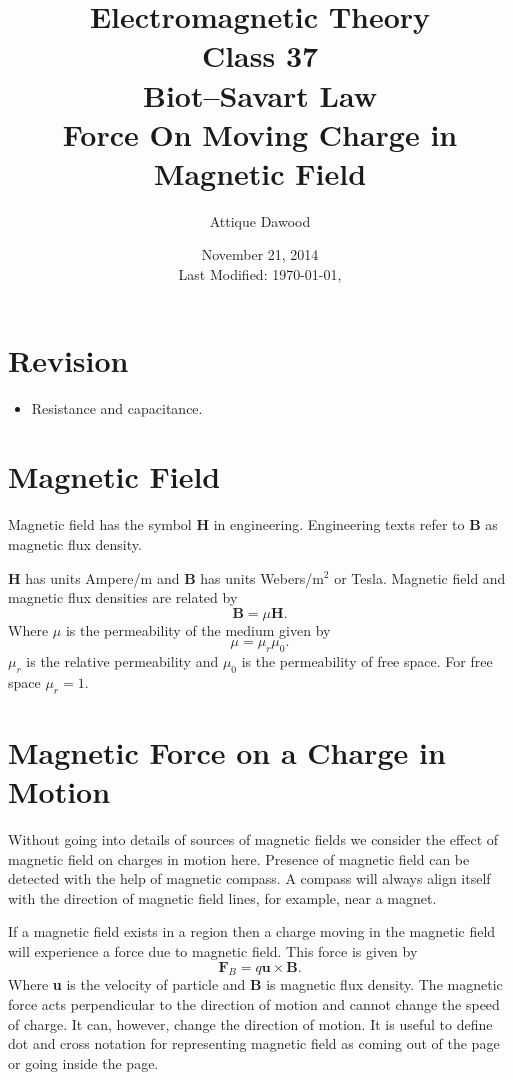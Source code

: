 \documentclass[12pt,a4paper]{article}
\title{Electromagnetic Theory\\Class 37\\Biot--Savart Law\\Force On Moving Charge in Magnetic Field}
\author{Attique Dawood}
\date{November 21, 2014\\[0.2cm] Last Modified: \today, \currenttime}
\begin{document}
\maketitle
\section{Revision}
\begin{itemize}
\item Resistance and capacitance.
\end{itemize}
\section{Magnetic Field}
Magnetic field has the symbol \textbf{H} in engineering. Engineering texts refer to \textbf{B} as magnetic flux density. 

\textbf{H} has units Ampere/m and \textbf{B} has units Webers/m$^2$ or Tesla. Magnetic field and magnetic flux densities are related by
\begin{equation}
\textbf{B}=\mu\textbf{H}.
\end{equation}
Where $\mu$ is the permeability of the medium given by
\begin{equation}
\mu=\mu_r\mu_0.
\end{equation}
$\mu_r$ is the relative permeability and $\mu_0$ is the permeability of free space. For free space $\mu_r=1$.
\section{Magnetic Force on a Charge in Motion}
Without going into details of sources of magnetic fields we consider the effect of magnetic field on charges in motion here. Presence of magnetic field can be detected with the help of magnetic compass. A compass will always align itself with the direction of magnetic field lines, for example, near a magnet.

If a magnetic field exists in a region then a charge moving in the magnetic field will experience a force due to magnetic field. This force is given by
\begin{equation}
\textbf{F}_B=q\textbf{u}\times\textbf{B}.
\end{equation}
Where \textbf{u} is the velocity of particle and \textbf{B} is magnetic flux density. The magnetic force acts perpendicular to the direction of motion and cannot change the speed of charge. It can, however, change the direction of motion. It is useful to define dot and cross notation for representing magnetic field as coming out of the page or going inside the page.
\end{document}
